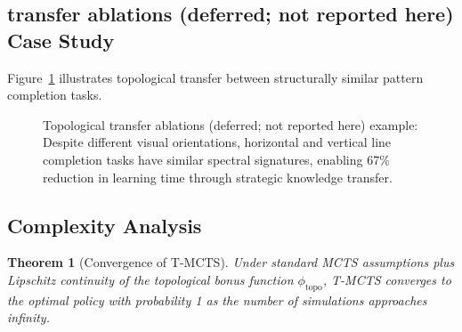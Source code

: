 \documentclass{article}
\newtheorem{theorem}{Theorem}
\begin{document}
\subsection{transfer ablations (deferred; not reported here) Case Study}

Figure~\ref{fig:transfer_example} illustrates topological transfer between structurally similar pattern completion tasks.

\begin{figure}[ht]
\centering
{}
\caption{Topological transfer ablations (deferred; not reported here) example: Despite different visual orientations, horizontal and vertical line completion tasks have similar spectral signatures, enabling 67\% reduction in learning time through strategic knowledge transfer.}
\label{fig:transfer_example}
\end{figure}

\subsection{Complexity Analysis}

\begin{theorem}[Convergence of T-MCTS]
Under standard MCTS assumptions plus Lipschitz continuity of the topological bonus function $\phi_{\text{topo}}$, T-MCTS converges to the optimal policy with probability 1 as the number of simulations approaches infinity.
\end{theorem}
\end{document}

